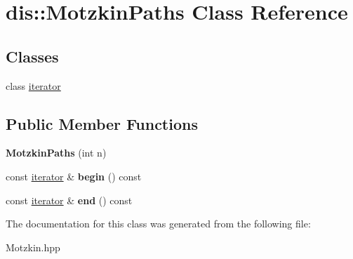 \hypertarget{classdis_1_1_motzkin_paths}{\section{dis\-:\-:Motzkin\-Paths Class Reference}
\label{classdis_1_1_motzkin_paths}
}
\subsection*{Classes}
\begin{DoxyCompactItemize}
\item 
class \hyperlink{classdis_1_1_motzkin_paths_1_1iterator}{iterator}
\end{DoxyCompactItemize}
\subsection*{Public Member Functions}
\begin{DoxyCompactItemize}
\item 
\hypertarget{classdis_1_1_motzkin_paths_abbc3bba4daa4365a7ba148d186ef1800}{{\bfseries Motzkin\-Paths} (int n)}\label{classdis_1_1_motzkin_paths_abbc3bba4daa4365a7ba148d186ef1800}

\item 
\hypertarget{classdis_1_1_motzkin_paths_a97c94a4a207db08d795c7809e62ddd87}{const \hyperlink{classdis_1_1_motzkin_paths_1_1iterator}{iterator} \& {\bfseries begin} () const }\label{classdis_1_1_motzkin_paths_a97c94a4a207db08d795c7809e62ddd87}

\item 
\hypertarget{classdis_1_1_motzkin_paths_ab80aa91db8f0136d38c6f9e95a3d1a5c}{const \hyperlink{classdis_1_1_motzkin_paths_1_1iterator}{iterator} \& {\bfseries end} () const }\label{classdis_1_1_motzkin_paths_ab80aa91db8f0136d38c6f9e95a3d1a5c}

\end{DoxyCompactItemize}


The documentation for this class was generated from the following file\-:\begin{DoxyCompactItemize}
\item 
Motzkin.\-hpp\end{DoxyCompactItemize}
